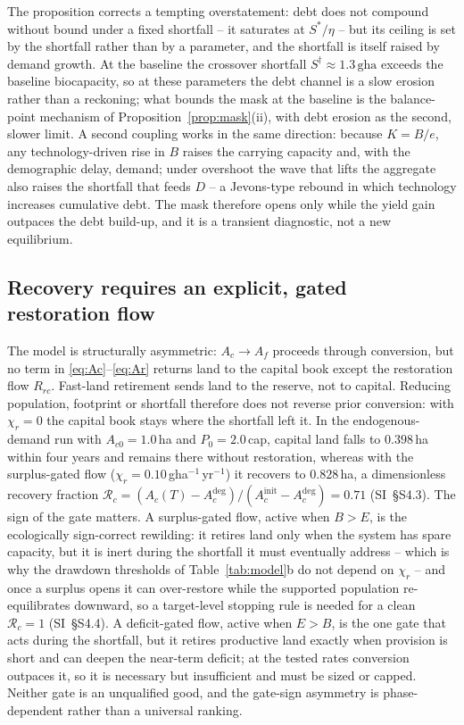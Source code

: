 \documentclass[preprint,12pt,authoryear]{elsarticle}
\begin{document}
The proposition corrects a tempting overstatement: debt does not compound without bound under a fixed shortfall -- it saturates at $S^*/\eta$ -- but its ceiling is set by the shortfall rather than by a parameter, and the shortfall is itself raised by demand growth. At the baseline the crossover shortfall $S^\dagger\approx1.3\,\mathrm{gha}$ exceeds the baseline biocapacity, so at these parameters the debt channel is a slow erosion rather than a reckoning; what bounds the mask at the baseline is the balance-point mechanism of Proposition~\ref{prop:mask}(ii), with debt erosion as the second, slower limit. A second coupling works in the same direction: because $K=B/e$, any technology-driven rise in $B$ raises the carrying capacity and, with the demographic delay, demand; under overshoot the wave that lifts the aggregate also raises the shortfall that feeds $D$ -- a Jevons-type rebound in which technology increases cumulative debt. The mask therefore opens only while the yield gain outpaces the debt build-up, and it is a transient diagnostic, not a new equilibrium.

\subsection{Recovery requires an explicit, gated restoration flow}\label{sec:recovery}

The model is structurally asymmetric: $A_c\to A_f$ proceeds through conversion, but no term in \eqref{eq:Ac}--\eqref{eq:Ar} returns land to the capital book except the restoration flow $R_{rc}$. Fast-land retirement sends land to the reserve, not to capital. Reducing population, footprint or shortfall therefore does not reverse prior conversion: with $\chi_r=0$ the capital book stays where the shortfall left it. In the endogenous-demand run with $A_{c0}=1.0$\,ha and $P_0=2.0$\,cap, capital land falls to $0.398$\,ha within four years and remains there without restoration, whereas with the surplus-gated flow ($\chi_r=0.10$\,gha$^{-1}$\,yr$^{-1}$) it recovers to $0.828$\,ha, a dimensionless recovery fraction $\mathcal R_c=(A_c(T)-A_c^{\mathrm{deg}})/(A_c^{\mathrm{init}}-A_c^{\mathrm{deg}})=0.71$ (SI~\S S4.3). The sign of the gate matters. A surplus-gated flow, active when $B>E$, is the ecologically sign-correct rewilding: it retires land only when the system has spare capacity, but it is inert during the shortfall it must eventually address -- which is why the drawdown thresholds of Table~\ref{tab:model}b do not depend on $\chi_r$ -- and once a surplus opens it can over-restore while the supported population re-equilibrates downward, so a target-level stopping rule is needed for a clean $\mathcal R_c=1$ (SI~\S S4.4). A deficit-gated flow, active when $E>B$, is the one gate that acts during the shortfall, but it retires productive land exactly when provision is short and can deepen the near-term deficit; at the tested rates conversion outpaces it, so it is necessary but insufficient and must be sized or capped. Neither gate is an unqualified good, and the gate-sign asymmetry is phase-dependent rather than a universal ranking.
\end{document}
